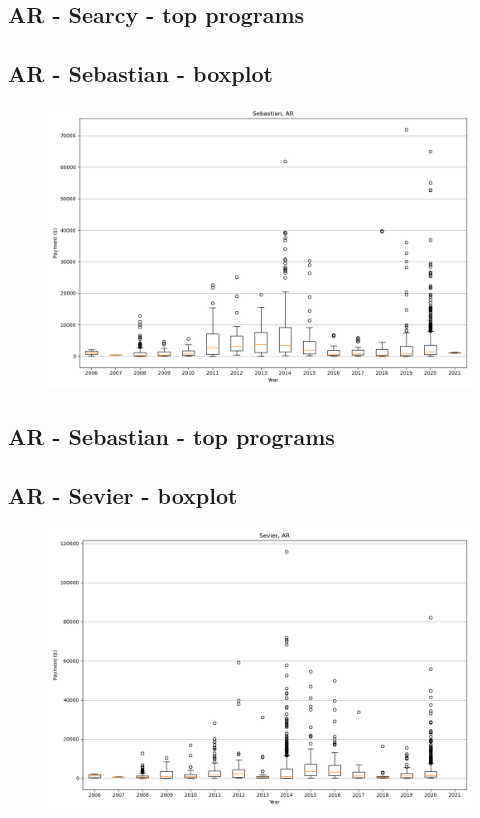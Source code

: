 \subsection*{AR - Searcy - top programs}

\newpage
\subsection*{AR - Sebastian - boxplot}
\begin{figure}[h]
\centering
\includegraphics[width=7in]{../output/boxplots/counties/Sebastian-AR_boxplot.png}
\end{figure}


\subsection*{AR - Sebastian - top programs}

\newpage
\subsection*{AR - Sevier - boxplot}
\begin{figure}[h]
\centering
\includegraphics[width=7in]{../output/boxplots/counties/Sevier-AR_boxplot.png}
\end{figure}


